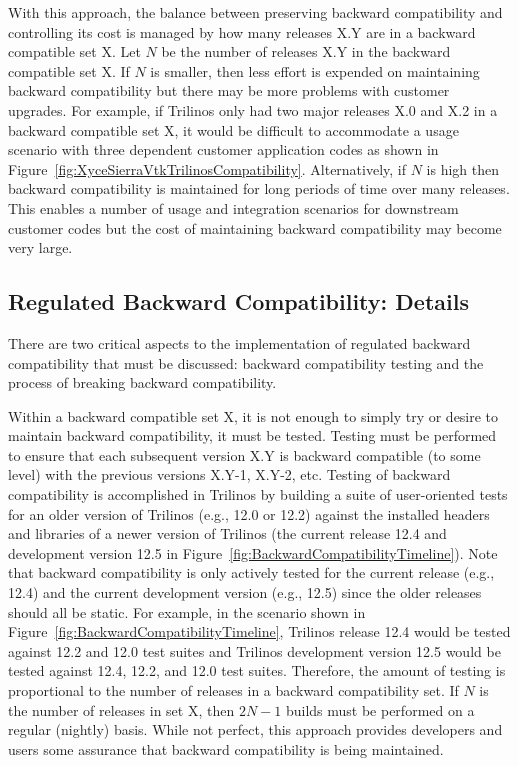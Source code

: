 \documentclass[11pt]{SANDreport}
\begin{document}
With this approach, the balance between preserving backward
compatibility and controlling its cost is managed by how many releases X.Y are in a
backward compatible set X.  Let $N$ be the number of releases X.Y in
the backward compatible set X.  If $N$ is smaller, then less effort is
expended on maintaining backward compatibility but there may be
more problems with customer upgrades.  For example, if Trilinos only
had two major releases X.0 and X.2 in a backward compatible set X, it
would be difficult to accommodate a usage scenario with three
dependent customer application codes as shown in
Figure~\ref{fig:XyceSierraVtkTrilinosCompatibility}.  Alternatively,
if $N$ is high then backward compatibility is maintained for long
periods of time over many releases.  This enables a number of usage
and integration scenarios for downstream customer codes but the cost
of maintaining backward compatibility may become very large.


%
{}\subsection{Regulated Backward Compatibility: Details}
\label{sec:details_reg_back_compat}
%

There are two critical aspects to the implementation of regulated
backward compatibility that must be discussed: backward compatibility
testing and the process of breaking backward compatibility.

Within a backward compatible set X, it is not enough to simply try or
desire to maintain backward compatibility, it must be tested.
Testing must be performed to ensure that
each subsequent version X.Y is backward compatible (to some level)
with the previous versions X.Y-1, X.Y-2, etc.  Testing of backward
compatibility is accomplished in Trilinos by building a suite of
user-oriented tests for an older version of Trilinos (e.g., 12.0 or
12.2) against the installed headers and libraries of a newer version
of Trilinos (the current release 12.4 and development version
12.5 in Figure~\ref{fig:BackwardCompatibilityTimeline}).  Note that
backward compatibility is only actively tested for the current release
(e.g., 12.4) and the current development version (e.g., 12.5) since
the older releases should all be static.  For example, in the
scenario shown in Figure~\ref{fig:BackwardCompatibilityTimeline},
Trilinos release 12.4 would be tested against 12.2 and 12.0 test suites and
Trilinos development version 12.5 would be tested against 12.4, 12.2,
and 12.0 test suites.  Therefore, the amount of testing is
proportional to the number of releases in a backward compatibility
set.  If $N$ is the number of releases in set
X, then $2 N-1$ builds must be performed on a
regular (nightly) basis.  While not perfect, this approach provides
developers and users some assurance that backward compatibility is
being maintained.
\end{document}

